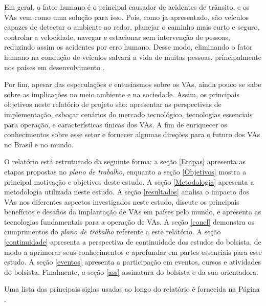 \documentclass[
	12pt,				%
	openany, %
	a4paper,			%
	english,			%
	french,				%
	spanish,			%
	brazil				%
	]{abntex2}
\begin{document}
Em geral, o fator humano é o principal causador de acidentes de trânsito, e os VAs vem como uma solução para isso. Pois, como ja apresentado, são veículos capazes de detectar o ambiente ao redor, planejar o caminho mais curto e seguro, controlar a velocidade, navegar e estacionar sem intervenção de pessoas, reduzindo assim os acidentes por erro humano.
Desse modo, eliminando o fator humano na condução de veículos salvará a vida de muitas pessoas, principalmente nos países em desenvolvimento \cite{mundobrasil}. 

Por fim, apesar das especulações e entusiasmos sobre os VAs, ainda pouco se sabe sobre as implicações no meio ambiente e na sociedade. Assim, os principais objetivos neste relatório de projeto são: apresentar as perspectivas de implementação, esboçar cenários do mercado tecnológico, tecnologias essenciais para operação, e características únicas dos VAs. A fim de enriquecer os conhecimentos sobre esse setor e fornecer algumas direções para o futuro dos VAs no Brasil e no mundo.

O relatório está estruturado da seguinte forma: a seção \ref{Etapas} apresenta as etapas propostas no \textit{plano de trabalho}, enquanto a seção \ref{Objetivos} mostra a principal motivação e objetivos deste estudo. A seção \ref{Metodologia} apresenta a metodologia utilizada neste estudo. A seção \ref{resultados} analisa o impacto dos VAs nos diferentes aspectos investigados neste estudo, discute os principais benefícios e desafios da implantação de VAs em países pelo mundo, e apresenta as tecnologias fundamentais para a operação de VAs. A seção \ref{concl} demonstra os cumprimentos do \textit{plano de trabalho} referente a este relatório. A seção \ref{continuidade} apresenta a perspectiva de continuidade dos estudos do bolsista, de modo a aprimorar seus conhecimentos e aprofundar em partes essenciais para esse estudo. A seção \ref{eventos} apresenta a participação em eventos, cursos e atividades do bolsista. Finalmente, a seção \ref{ass} assinatura do bolsista e da sua orientadora.


Uma lista das principais siglas usadas ao longo do relatório é fornecida na Página \pageref{eq:1}.





\end{document}
